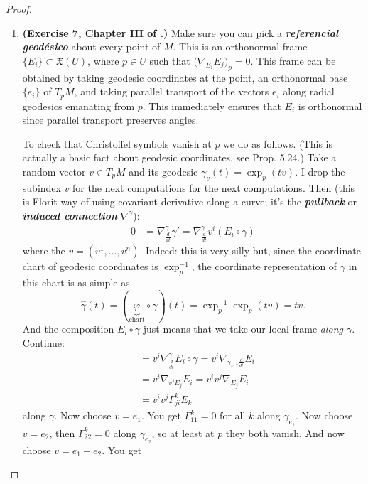 \begin{proof}\leavevmode
\begin{enumerate}[label=\textbf{Step \arabic*}]
	\item \textbf{(Exercise 7, Chapter III of  \cite{doc}.)} Make sure you can pick a \textit{\textbf{referencial geodésico}} about every point of \(M\). This is an orthonormal frame \(\{E_i\} \subset \mathfrak{X}(U)\), where \(p \in U\) such that \(\Big(\nabla_{E_i}E_j\Big)_p=0\). This frame can be obtained by taking geodesic coordinates at the point, an orthonormal base \(\{e_i\}\) of \(T_pM\), and taking parallel transport of the vectors \(e_i\) along radial geodesics emanating from \(p\). This immediately ensures that \(E_i\) is orthonormal since parallel transport preserves angles.

		To check that Christoffel symbols vanish at \(p\) we do as follows. (This is actually a basic fact about geodesic coordinates, see \cite{ler} Prop. 5.24.) Take a random vector \(v \in T_pM\) and its geodesic \(\gamma_v(t)=\operatorname{exp}_p(tv)\). I drop the subindex \(v\) for the next computations for the next computations. Then (this is Florit way of using covariant derivative along a curve; it's the \textit{\textbf{pullback}} or \textit{\textbf{induced connection}} \(\nabla^{\gamma}\)):
		\begin{align*}
			0&=\nabla_{\frac{d}{dt}}^{\gamma}\gamma'=\nabla^{\gamma}_{\frac{d}{dt}}v^i(E_i\circ \gamma)
		\end{align*}
		where the \(v=(v^1,\ldots,v^n)\). Indeed: this is very silly but, since the coordinate chart of geodesic coordinates is \(\operatorname{exp}_p^{-1}\), the coordinate representation of \(\gamma\) in this chart is as simple as
	\[\hat{\gamma}(t)=(\underbrace{\varphi}_{\text{chart}} \circ \gamma)(t)=\operatorname{exp}_p^{-1} \operatorname{exp}_p(tv)=tv.\]
And the composition \(E_i \circ \gamma\) just means that we take our local frame \textit{along \(\gamma\)}. Continue:
		\begin{align*}
		&=v^i\nabla^{\gamma}_{\frac{d}{dt}}E_i\circ\gamma=v^i\nabla_{\gamma_{v,*} \frac{d}{dt}}E_i\\&=v^i\nabla_{v^jE_j}E_i=v^iv^j\nabla_{E_j}E_i\\&=v^iv^j\Gamma_{ji}^kE_k
		\end{align*}
along \(\gamma\). Now choose \(v=e_1\). You get \(\Gamma_{11}^k=0\) for all \(k\) along \(\gamma_{e_1}\). Now choose \(v=e_2\), then \(\Gamma_{22}^k=0\) along \(\gamma_{e_2}\), so at least at \(p\) they both vanish. And now choose \(v=e_1+e_2\). You get

\end{enumerate}
\end{proof}
